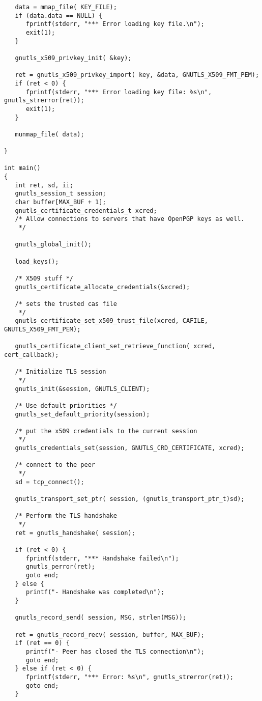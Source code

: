 \begin{verbatim}
   data = mmap_file( KEY_FILE);
   if (data.data == NULL) {
      fprintf(stderr, "*** Error loading key file.\n");
      exit(1);
   }

   gnutls_x509_privkey_init( &key);
   
   ret = gnutls_x509_privkey_import( key, &data, GNUTLS_X509_FMT_PEM);
   if (ret < 0) {
      fprintf(stderr, "*** Error loading key file: %s\n", gnutls_strerror(ret));
      exit(1);
   }

   munmap_file( data);
   
}

int main()
{
   int ret, sd, ii;
   gnutls_session_t session;
   char buffer[MAX_BUF + 1];
   gnutls_certificate_credentials_t xcred;
   /* Allow connections to servers that have OpenPGP keys as well.
    */

   gnutls_global_init();

   load_keys();

   /* X509 stuff */
   gnutls_certificate_allocate_credentials(&xcred);

   /* sets the trusted cas file
    */
   gnutls_certificate_set_x509_trust_file(xcred, CAFILE, GNUTLS_X509_FMT_PEM);

   gnutls_certificate_client_set_retrieve_function( xcred, cert_callback);
   
   /* Initialize TLS session 
    */
   gnutls_init(&session, GNUTLS_CLIENT);

   /* Use default priorities */
   gnutls_set_default_priority(session);

   /* put the x509 credentials to the current session
    */
   gnutls_credentials_set(session, GNUTLS_CRD_CERTIFICATE, xcred);

   /* connect to the peer
    */
   sd = tcp_connect();

   gnutls_transport_set_ptr( session, (gnutls_transport_ptr_t)sd);

   /* Perform the TLS handshake
    */
   ret = gnutls_handshake( session);

   if (ret < 0) {
      fprintf(stderr, "*** Handshake failed\n");
      gnutls_perror(ret);
      goto end;
   } else {
      printf("- Handshake was completed\n");
   }

   gnutls_record_send( session, MSG, strlen(MSG));

   ret = gnutls_record_recv( session, buffer, MAX_BUF);
   if (ret == 0) {
      printf("- Peer has closed the TLS connection\n");
      goto end;
   } else if (ret < 0) {
      fprintf(stderr, "*** Error: %s\n", gnutls_strerror(ret));
      goto end;
   }


\end{verbatim}
